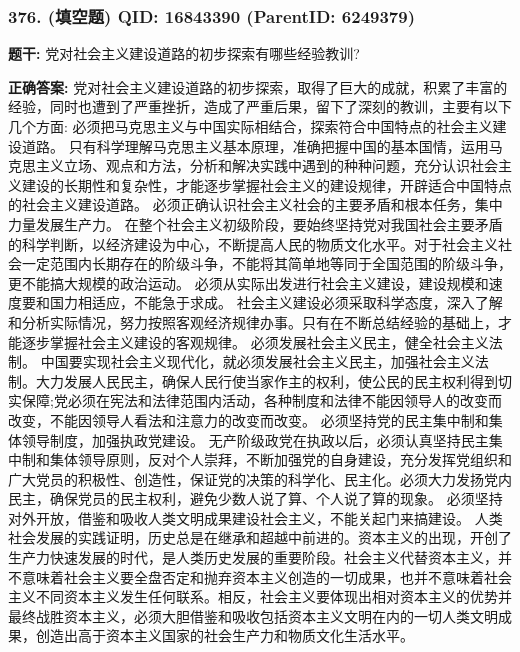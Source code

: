 \documentclass[12pt,UTF8]{ctexart}
\begin{document}
\vspace{0.3em}\hrulefill\vspace{0.7em}

\subsubsection*{376. (填空题) \small QID: 16843390 (ParentID: 6249379)}

\textbf{题干:}
党对社会主义建设道路的初步探索有哪些经验教训?



\textbf{正确答案:}
党对社会主义建设道路的初步探索，取得了巨大的成就，积累了丰富的经验，同时也遭到了严重挫折，造成了严重后果，留下了深刻的教训，主要有以下几个方面:
必须把马克思主义与中国实际相结合，探索符合中国特点的社会主义建设道路。
只有科学理解马克思主义基本原理，准确把握中国的基本国情，运用马克思主义立场、观点和方法，分析和解决实践中遇到的种种问题，充分认识社会主义建设的长期性和复杂性，才能逐步掌握社会主义的建设规律，开辟适合中国特点的社会主义建设道路。
必须正确认识社会主义社会的主要矛盾和根本任务，集中力量发展生产力。
在整个社会主义初级阶段，要始终坚持党对我国社会主要矛盾的科学判断，以经济建设为中心，不断提高人民的物质文化水平。对于社会主义社会一定范围内长期存在的阶级斗争，不能将其简单地等同于全国范围的阶级斗争，更不能搞大规模的政治运动。
必须从实际出发进行社会主义建设，建设规模和速度要和国力相适应，不能急于求成。
社会主义建设必须采取科学态度，深入了解和分析实际情况，努力按照客观经济规律办事。只有在不断总结经验的基础上，才能逐步掌握社会主义建设的客观规律。
必须发展社会主义民主，健全社会主义法制。
中国要实现社会主义现代化，就必须发展社会主义民主，加强社会主义法制。大力发展人民民主，确保人民行使当家作主的权利，使公民的民主权利得到切实保障;党必须在宪法和法律范围内活动，各种制度和法律不能因领导人的改变而改变，不能因领导人看法和注意力的改变而改变。
必须坚持党的民主集中制和集体领导制度，加强执政党建设。
无产阶级政党在执政以后，必须认真坚持民主集中制和集体领导原则，反对个人崇拜，不断加强党的自身建设，充分发挥党组织和广大党员的积极性、创造性，保证党的决策的科学化、民主化。必须大力发扬党内民主，确保党员的民主权利，避免少数人说了算、个人说了算的现象。
必须坚持对外开放，借鉴和吸收人类文明成果建设社会主义，不能关起门来搞建设。
人类社会发展的实践证明，历史总是在继承和超越中前进的。资本主义的出现，开创了生产力快速发展的时代，是人类历史发展的重要阶段。社会主义代替资本主义，并不意味着社会主义要全盘否定和抛弃资本主义创造的一切成果，也并不意味着社会主义不同资本主义发生任何联系。相反，社会主义要体现出相对资本主义的优势并最终战胜资本主义，必须大胆借鉴和吸收包括资本主义文明在内的一切人类文明成果，创造出高于资本主义国家的社会生产力和物质文化生活水平。
\end{document}
